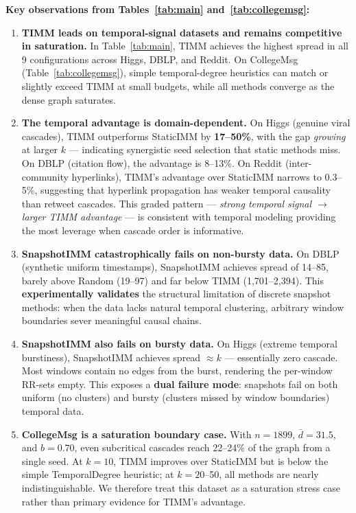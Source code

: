 \documentclass[10pt,conference]{IEEEtran}
\begin{document}
\textbf{Key observations from Tables~\ref{tab:main} and~\ref{tab:collegemsg}:}

\begin{enumerate}
\item \textbf{TIMM leads on temporal-signal datasets and remains competitive in saturation.}
In Table~\ref{tab:main}, TIMM achieves the highest spread in all 9 configurations across Higgs, DBLP, and Reddit.
On CollegeMsg (Table~\ref{tab:collegemsg}), simple temporal-degree heuristics can match or slightly exceed TIMM at small budgets, while all methods converge as the dense graph saturates.

\item \textbf{The temporal advantage is domain-dependent.}
On Higgs (genuine viral cascades), TIMM outperforms StaticIMM by \textbf{17--50\%}, with the gap \emph{growing} at larger $k$ — indicating synergistic seed selection that static methods miss.
On DBLP (citation flow), the advantage is 8--13\%.
On Reddit (inter-community hyperlinks), TIMM's advantage over StaticIMM narrows to 0.3--5\%, suggesting that hyperlink propagation has weaker temporal causality than retweet cascades.
This graded pattern — \emph{strong temporal signal $\rightarrow$ larger TIMM advantage} — is consistent with temporal modeling providing the most leverage when cascade order is informative.

\item \textbf{SnapshotIMM catastrophically fails on non-bursty data.}
On DBLP (synthetic uniform timestamps), SnapshotIMM achieves spread of 14--85, barely above Random (19--97) and far below TIMM (1,701--2,394).
This \textbf{experimentally validates} the structural limitation of discrete snapshot methods: when the data lacks natural temporal clustering, arbitrary window boundaries sever meaningful causal chains.

\item \textbf{SnapshotIMM also fails on bursty data.}
On Higgs (extreme temporal burstiness), SnapshotIMM achieves spread $\approx k$ — essentially zero cascade.
Most windows contain no edges from the burst, rendering the per-window RR-sets empty.
This exposes a \textbf{dual failure mode}: snapshots fail on both uniform (no clusters) and bursty (clusters missed by window boundaries) temporal data.

\item \textbf{CollegeMsg is a saturation boundary case.}
With $n=1899$, $\bar{d}=31.5$, and $b=0.70$, even subcritical cascades reach 22--24\% of the graph from a single seed.
At $k=10$, TIMM improves over StaticIMM but is below the simple TemporalDegree heuristic; at $k=20$--50, all methods are nearly indistinguishable.
We therefore treat this dataset as a saturation stress case rather than primary evidence for TIMM's advantage.


\end{enumerate}
\end{document}
